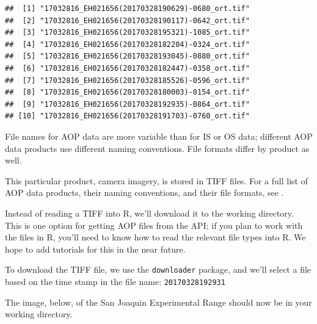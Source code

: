 \documentclass[]{book}
\newenvironment{Shaded}{\begin{snugshade}}{\end{snugshade}}
\newcommand{\DataTypeTok}[1]{\textcolor[rgb]{0.13,0.29,0.53}{#1}}
\newcommand{\KeywordTok}[1]{\textcolor[rgb]{0.13,0.29,0.53}{\textbf{#1}}}
\newcommand{\NormalTok}[1]{#1}
\newcommand{\OperatorTok}[1]{\textcolor[rgb]{0.81,0.36,0.00}{\textbf{#1}}}
\newcommand{\StringTok}[1]{\textcolor[rgb]{0.31,0.60,0.02}{#1}}
\begin{document}
\begin{verbatim}
##  [1] "17032816_EH021656(20170328190629)-0680_ort.tif"
##  [2] "17032816_EH021656(20170328190117)-0642_ort.tif"
##  [3] "17032816_EH021656(20170328195321)-1085_ort.tif"
##  [4] "17032816_EH021656(20170328182204)-0324_ort.tif"
##  [5] "17032816_EH021656(20170328193045)-0880_ort.tif"
##  [6] "17032816_EH021656(20170328182447)-0358_ort.tif"
##  [7] "17032816_EH021656(20170328185526)-0596_ort.tif"
##  [8] "17032816_EH021656(20170328180003)-0154_ort.tif"
##  [9] "17032816_EH021656(20170328192935)-0864_ort.tif"
## [10] "17032816_EH021656(20170328191703)-0760_ort.tif"
\end{verbatim}

File names for AOP data are more variable than for IS or OS data;
different AOP data products use different naming conventions.
File formats differ by product as well.

This particular product, camera imagery, is stored in TIFF files.
For a full list of AOP data products, their naming conventions, and
their file formats, see .

Instead of reading a TIFF into R, we'll download it to the working
directory. This is one option for getting AOP files from the API; if
you plan to work with the files in R, you'll need to know how to
read the relevant file types into R. We hope to add tutorials for
this in the near future.

To download the TIFF file, we use the \texttt{downloader} package, and we'll
select a file based on the time stamp in the file name: \texttt{20170328192931}

\begin{Shaded}
\end{Shaded}

The image, below, of the San Joaquin Experimental Range should now be in your
working directory.
\end{document}
